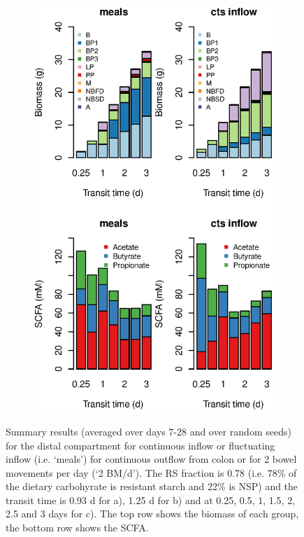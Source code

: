 \documentclass[a4paper]{article}
\begin{document}
\begin{figure}
\begin{subfigure}[t]{0.32\textwidth}
      \includegraphics[scale=0.35]{images/transitTimebarSmall.eps}
    \end{subfigure}
    \caption{Summary results (averaged over days 7-28 and over random seeds) for the distal compartment for continuous inflow or fluctuating inflow (i.e. `meals') for continuous outflow from colon or for 2 bowel movements per day (`2 BM/d'). The RS fraction is 0.78 (i.e. 78\% of the dietary carbohyrate is resistant starch and 22\% is NSP) and the transit time is 0.93 d for a), 1.25 d for b) and at 0.25, 0.5, 1, 1.5, 2, 2.5 and 3 days for c). The top row shows the biomass of each group, the bottom row shows the SCFA.}
    \label{fig:std}
\end{figure}
\end{document}
